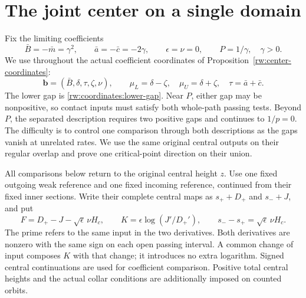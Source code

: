 \section{The joint center on a single domain}\label{rw:joint-section}

Fix the limiting coefficients
\[
 \bar B=-\bar m=\gamma^2,\qquad
 \bar a=-\bar c=-2\gamma,\qquad \epsilon=\nu=0,
 \qquad P=1/\gamma,\quad\gamma>0.
\]
We use throughout the actual coefficient coordinates of
Proposition~\ref{rw:center-coordinates}:
\[
 \mathbf b=(\bar B,\delta,\tau,\zeta,\nu),\qquad
 \mu_L=\delta-\zeta,\quad\mu_U=\delta+\zeta,\quad
 \tau=\bar a+\bar c.
\]
The lower gap is \eqref{rw:coordinates:lower-gap}. Near $P$, either
gap may be nonpositive, so contact inputs must satisfy both whole-path
passing tests. Beyond $P$, the separated description requires two
positive gaps and continues to $1/p=0$. The difficulty is to control
one comparison through both descriptions as the gaps vanish at unrelated
rates. We use the same original central outputs on their regular overlap
and prove one critical-point direction on their union.

All comparisons below return to the original central height $z$.
Use one fixed outgoing weak reference and one fixed incoming
reference, continued from their fixed inner sections. Write their
complete central maps as $s_++D_+$ and $s_-+J$, and put
\begin{equation}\label{rw:joint:closing}
 F=D_+-J-\sqrt\epsilon\,\nu H_c,\qquad
 K=\epsilon\log(J'/D_+'),\qquad s_--s_+=\sqrt\epsilon\,\nu H_c .
\end{equation}
The prime refers to the same input in the two derivatives. Both
derivatives are nonzero with the same sign on each open passing
interval. A common change of input composes $K$ with that change;
it introduces no extra logarithm. Signed central continuations are
used for coefficient comparison. Positive total central heights and
the actual collar conditions are additionally imposed on counted
orbits.

